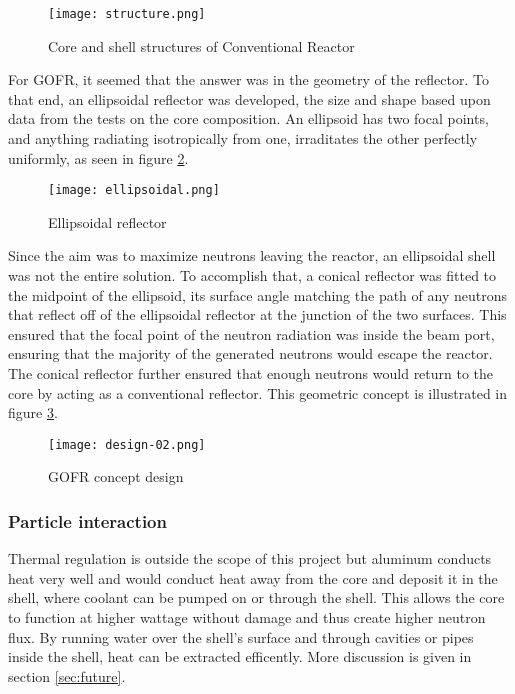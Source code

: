 \begin{figure}[!htbp]
\caption{Core and shell structures of Conventional Reactor}
\label{fig:structure}
\centering
\texttt{[image: structure.png]}
\end{figure}

For GOFR, it seemed that the answer was in the geometry of the reflector. To that end, an ellipsoidal reflector was developed, the size and shape based upon data from the tests on the core composition. An ellipsoid has two focal points, and anything radiating isotropically from one, irraditates the other perfectly uniformly, as seen in figure \ref{fig:ellipsoid}.

\begin{figure}[!htbp]
\caption{Ellipsoidal reflector}
\label{fig:ellipsoid}
\centering
\texttt{[image: ellipsoidal.png]}
\end{figure}

Since the aim was to maximize neutrons leaving the reactor, an ellipsoidal shell was not the entire solution. To accomplish that, a conical reflector was fitted to the midpoint of the ellipsoid, its surface angle matching the path of any neutrons that reflect off of the ellipsoidal reflector at the junction of the two surfaces. This ensured that the focal point of the neutron radiation was inside the beam port, ensuring that the majority of the generated neutrons would escape the reactor. The conical reflector further ensured that enough neutrons would return to the core by acting as a conventional reflector. This geometric concept is illustrated in figure \ref{fig:design02}.

\begin{figure}[!htbp]
\caption{GOFR concept design}
\label{fig:design02}
\centering
\texttt{[image: design-02.png]}
\end{figure}

\subsubsection{Particle interaction}

Thermal regulation is outside the scope of this project but aluminum conducts heat very well and would conduct heat away from the core and deposit it in the shell, where coolant can be pumped on or through the shell. This allows the core to function at higher wattage without damage and thus create higher neutron flux. By running water over the shell's surface and through cavities or pipes inside the shell, heat can be extracted efficently. More discussion is given in section \ref{sec:future}.

